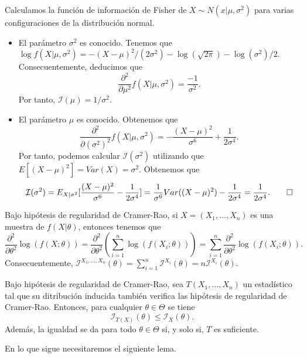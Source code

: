     \begin{ex}
        Calculamos la función de información de Fisher de $X \sim N(x|\mu, \sigma^2)$ para varias configuraciones de la distribución normal.
        \begin{itemize}
            \item El parámetro $\sigma^2$ es conocido. Tenemos que $\log f(X|\mu, \sigma^2) = - (X-\mu)^2 / (2\sigma^2) - \log(\sqrt{2\pi}) - \log(\sigma^2)/2$. Consecuentemente, deducimos que \[\frac{\partial^2}{\partial\mu^2} f(X|\mu,\sigma^2) = \frac{-1}{\sigma^2}.\]
            Por tanto, $\mathcal{I}(\mu) = 1 / \sigma^2$.
            \item El parámetro $\mu$ es conocido. Obtenemos que
            \[\frac{\partial^2}{\partial(\sigma^2)^2} f(X|\mu,\sigma^2) = -\frac{(X-\mu)^2}{\sigma^6} + \frac{1}{2\sigma^4}.\]
            Por tanto, podemos calcular $\mathcal{I}(\sigma^2)$ utilizando que $E[(X-\mu)^2] = Var(X) = \sigma^2$. Obtenemos que
            \[\mathcal{I}(\sigma^2) = E_{X|\sigma^2}[\frac{(X-\mu)^2}{\sigma^6} - \frac{1}{2\sigma^4}] = \frac{1}{\sigma^6} Var((X-\mu)^2) - \frac{1}{2\sigma^4} = \frac{1}{2\sigma^4}. \qedhere\]
        \end{itemize}
    \end{ex}

    \begin{remark}
        Bajo hipótesis de regularidad de Cramer-Rao, si $X=(X_1, \ldots, X_n)$ es una muestra de $f(X|\theta)$, entonces tenemos que
        \[\frac{\partial^2}{\partial \theta^2}\log(f(X;\theta)) = \frac{\partial^2}{\partial \theta^2} \left(\sum_{i = 1}^n \log(f(X_i;\theta))\right) = \sum_{i = 1}^n \frac{\partial^2}{\partial \theta^2}\log(f(X_i;\theta)).\]
        Consecuentemente, $\mathcal{I}^{X_1, \ldots, X_n}(\theta) = \sum_{i = 1}^n \mathcal{I}^{X_i}(\theta) = n \mathcal{I}^{X_i}(\theta)$.
    \end{remark}

    \begin{lem}
        Bajo hipótesis de regularidad de Cramer-Rao, sea $T(X_1, \ldots, X_n)$ un estadístico tal que su ditribución inducida también verifica las hipótesis de regularidad de Cramer-Rao. Entonces, para cualquier $\theta \in \Theta$ se tiene
        \[\mathcal{I}_{T(X)}(\theta) \le \mathcal{I}_{X}(\theta).\]
        Además, la igualdad se da para todo $\theta \in \Theta$ si, y solo si, $T$ es suficiente.
    \end{lem}

    En lo que sigue necesitaremos el siguiente lema.

